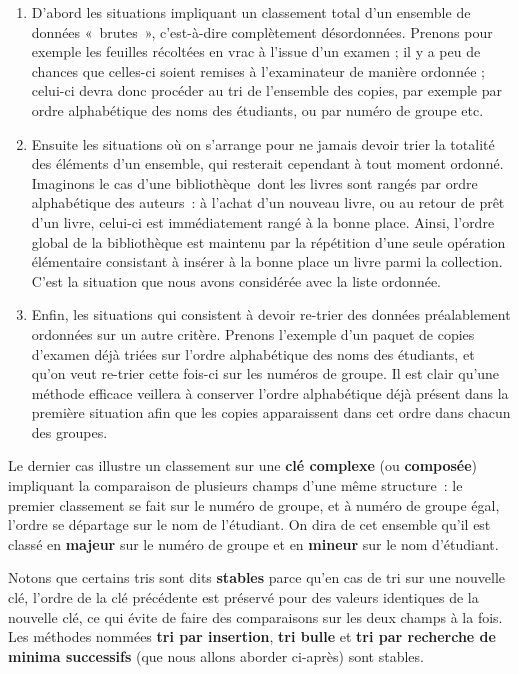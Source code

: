 	\liststyleWWviiiNumi
	\begin{enumerate}
		\item 
			D’abord les situations impliquant un classement total d’un ensemble de
			données «~brutes~», c’est-à-dire complètement désordonnées. Prenons
			pour exemple les feuilles récoltées en vrac à l’issue d’un examen ; il
			y a peu de chances que celles-ci soient remises à l’examinateur de
			manière ordonnée ; celui-ci devra donc procéder au tri de l’ensemble
			des copies, par exemple par ordre alphabétique des noms des étudiants,
			ou par numéro de groupe etc.
		\item 
			Ensuite les situations où on s’arrange pour ne jamais devoir trier la
			totalité des éléments d’un ensemble, qui resterait cependant à tout
			moment ordonné. Imaginons le cas d’une bibliothèque~dont les livres
			sont rangés par ordre alphabétique des auteurs~: à l’achat d’un nouveau
			livre, ou au retour de prêt d’un livre, celui-ci est immédiatement
			rangé à la bonne place. Ainsi, l’ordre global de la bibliothèque est
			maintenu par la répétition d’une seule opération élémentaire consistant
			à insérer à la bonne place un livre parmi la collection. C’est la
			situation que nous avons considérée avec la liste ordonnée.
		\item 
			Enfin, les situations qui consistent à devoir re-trier des données
			préalablement ordonnées sur un autre critère. Prenons l’exemple d’un
			paquet de copies d’examen déjà triées sur l’ordre alphabétique des noms
			des étudiants, et qu’on veut re-trier cette fois-ci sur les numéros de
			groupe. Il est clair qu’une méthode efficace veillera à conserver
			l’ordre alphabétique déjà présent dans la première situation afin que
			les copies apparaissent dans cet ordre dans chacun des groupes.
	\end{enumerate}
	
	Le dernier cas illustre un classement sur une \textbf{clé complexe}
	(ou \textbf{composée}) impliquant la comparaison de plusieurs champs
	d’une même structure~: le premier classement se fait sur le numéro de
	groupe, et à numéro de groupe égal, l’ordre se départage sur le nom de
	l’étudiant. On dira de cet ensemble qu’il est classé en \textbf{majeur}
	sur le numéro de groupe et en \textbf{mineur} sur le nom d’étudiant.

	Notons que certains tris sont dits \textbf{stables} parce
	qu'en cas de tri sur une nouvelle clé, l’ordre de la
	clé précédente est préservé pour des valeurs identiques de la nouvelle
	clé, ce qui évite de faire des comparaisons sur les deux champs à la
	fois. Les méthodes nommées \textbf{tri par insertion}, \textbf{tri
	bulle} et \textbf{tri par recherche de minima successifs }(que nous
	allons aborder ci-après) sont stables.


